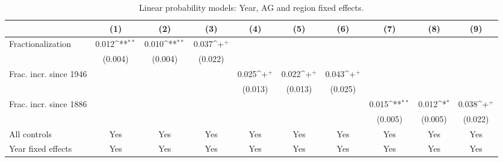 \begin{table}[htbp]\centering
\def\sym#1{\ifmmode^{#1}\else\(^{#1}\)\fi}
\caption{Linear probability models: Year, AG and region fixed effects. \label{tab:rob:fe1}}
\begin{tabular}{l*{9}{c}}
\hline\hline
                    &\multicolumn{1}{c}{(1)}         &\multicolumn{1}{c}{(2)}         &\multicolumn{1}{c}{(3)}         &\multicolumn{1}{c}{(4)}         &\multicolumn{1}{c}{(5)}         &\multicolumn{1}{c}{(6)}         &\multicolumn{1}{c}{(7)}         &\multicolumn{1}{c}{(8)}         &\multicolumn{1}{c}{(9)}         \\
\hline
Fractionalization   &       0.012\sym{**} &       0.010\sym{**} &       0.037\sym{+}  &                     &                     &                     &                     &                     &                     \\
                    &     (0.004)         &     (0.004)         &     (0.022)         &                     &                     &                     &                     &                     &                     \\
Frac. incr. since 1946&                     &                     &                     &       0.025\sym{+}  &       0.022\sym{+}  &       0.043\sym{+}  &                     &                     &                     \\
                    &                     &                     &                     &     (0.013)         &     (0.013)         &     (0.025)         &                     &                     &                     \\
Frac. incr. since 1886&                     &                     &                     &                     &                     &                     &       0.015\sym{**} &       0.012\sym{*}  &       0.038\sym{+}  \\
                    &                     &                     &                     &                     &                     &                     &     (0.005)         &     (0.005)         &     (0.022)         \\
\hline
All controls        &         Yes         &         Yes         &         Yes         &         Yes         &         Yes         &         Yes         &         Yes         &         Yes         &         Yes         \\
Year fixed effects  &         Yes         &         Yes         &         Yes         &         Yes         &         Yes         &         Yes         &         Yes         &         Yes         &         Yes         \\

\end{tabular}
\end{table}
